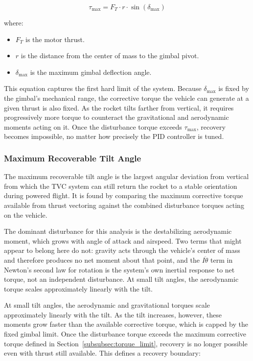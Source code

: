 \[
\tau_{\max} = F_T \cdot r \cdot \sin(\delta_{\max})
\]

where:

\begin{itemize}
    \item $F_T$ is the motor thrust.
    \item $r$ is the distance from the center of mass to the gimbal pivot.
    \item $\delta_{\max}$ is the maximum gimbal deflection angle.
\end{itemize}
This equation captures the first hard limit of the system. Because $\delta_{\max}$ is fixed by the gimbal's mechanical range, the corrective torque the vehicle can generate at a given thrust is also fixed. As the rocket tilts farther from vertical, it requires progressively more torque to counteract the gravitational and aerodynamic moments acting on it. Once the disturbance torque exceeds $\tau_{\max}$, recovery becomes impossible, no matter how precisely the PID controller is tuned.

\subsubsection{Maximum Recoverable Tilt Angle}
\label{subsubsec:max_tilt}
The maximum recoverable tilt angle is the largest angular deviation from vertical from which the TVC system can still return the rocket to a stable orientation during powered flight. It is found by comparing the maximum corrective torque available from thrust vectoring against the combined disturbance torques acting on the vehicle. 

The dominant disturbance for this analysis is the destabilizing aerodynamic moment, which grows with angle of attack and airspeed. Two terms that might appear to belong here do not: gravity acts through the vehicle's center of mass and therefore produces no net moment about that point, and the $I\ddot{\theta}$ term in Newton's second law for rotation is the system's own inertial response to net torque, not an independent disturbance. At small tilt angles, the aerodynamic torque scales approximately linearly with the tilt.

At small tilt angles, the aerodynamic and gravitational torques scale approximately linearly with the tilt. As the tilt increases, however, these moments grow faster than the available corrective torque, which is capped by the fixed gimbal limit. Once the disturbance torque exceeds the maximum corrective torque defined in Section~\ref{subsubsec:torque_limit}, recovery is no longer possible even with thrust still available. This defines a recovery boundary:

